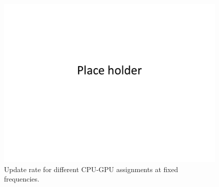 \begin{figure}[t]
	\centering
	\includegraphics[scale=0.2]{Figs/placeHolder}
	\caption{Update rate for different CPU-GPU assignments at fixed frequencies.}
	\label{fig:same freq diff assignment}
\end{figure}